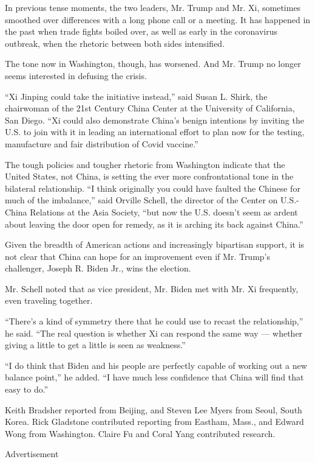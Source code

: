 In previous tense moments, the two leaders, Mr. Trump and Mr. Xi,
sometimes smoothed over differences with a long phone call or a meeting.
It has happened in the past when trade fights boiled over, as well as
early in the coronavirus outbreak, when the rhetoric between both sides
intensified.

The tone now in Washington, though, has worsened. And Mr. Trump no
longer seems interested in defusing the crisis.

``Xi Jinping could take the initiative instead,'' said Susan L. Shirk,
the chairwoman of the 21st Century China Center at the University of
California, San Diego. ``Xi could also demonstrate China's benign
intentions by inviting the U.S. to join with it in leading an
international effort to plan now for the testing, manufacture and fair
distribution of Covid vaccine.''

The tough policies and tougher rhetoric from Washington indicate that
the United States, not China, is setting the ever more confrontational
tone in the bilateral relationship. ``I think originally you could have
faulted the Chinese for much of the imbalance,'' said Orville Schell,
the director of the Center on U.S.-China Relations at the Asia Society,
``but now the U.S. doesn't seem as ardent about leaving the door open
for remedy, as it is arching its back against China.''

Given the breadth of American actions and increasingly bipartisan
support, it is not clear that China can hope for an improvement even if
Mr. Trump's challenger, Joseph R. Biden Jr., wins the election.

Mr. Schell noted that as vice president, Mr. Biden met with Mr. Xi
frequently, even traveling together.

``There's a kind of symmetry there that he could use to recast the
relationship,'' he said. ``The real question is whether Xi can respond
the same way --- whether giving a little to get a little is seen as
weakness.''

``I do think that Biden and his people are perfectly capable of working
out a new balance point,'' he added. ``I have much less confidence that
China will find that easy to do.''

Keith Bradsher reported from Beijing, and Steven Lee Myers from Seoul,
South Korea. Rick Gladstone contributed reporting from Eastham, Mass.,
and Edward Wong from Washington. Claire Fu and Coral Yang contributed
research.

Advertisement

